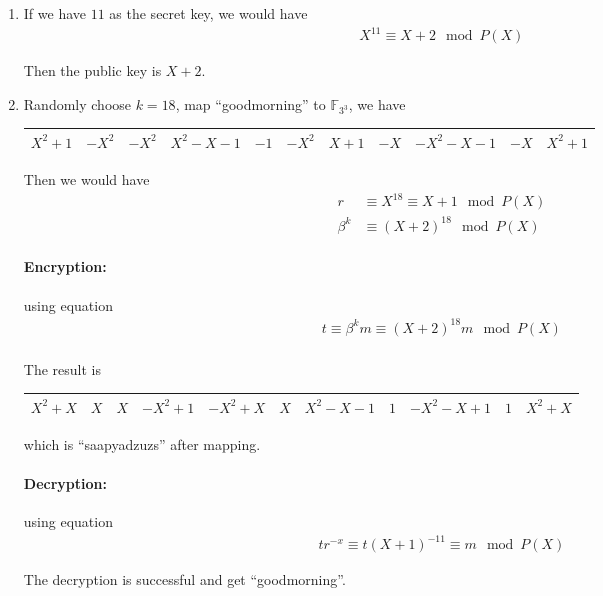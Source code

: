 \documentclass[11pt,a4paper]{article}
\begin{document}
\begin{enumerate}
\item If we have $11$ as the secret key, we would have
\begin{align*}
	X^{11} \equiv X + 2 \mod P(X)
\end{align*}
\par Then the public key is $X + 2$.

\newpage
\item Randomly choose $k = 18$, map ``goodmorning'' to $\mathbb{F}_{3^{3}}$, we have
\begin{table}[!ht]
\centering
\footnotesize
\begin{tabular}{|c|c|c|c|c|c|c|c|c|c|c|}
\hline
$X^2 + 1$ & $-X^2$ & $-X^2$ & $X^2 - X - 1$ & $-1$ & $-X^2$ & $X + 1$ & $-X$ & $- X^2 - X - 1$ & $-X$ & $X^2 + 1$ \\
\hline
\end{tabular}
\end{table}
\par Then we would have
\begin{align*}
	r &\equiv X^{18} \equiv X + 1 \mod P(X) \\
	\beta^{k} &\equiv (X+2)^{18} \mod P(X)
\end{align*}
\paragraph*{Encryption:} using equation
\begin{align*}
	t \equiv \beta^{k}m \equiv (X+2)^{18}m \mod P(X) \\
\end{align*}
\par The result is
\begin{table}[!ht]
\centering
\footnotesize
\begin{tabular}{|c|c|c|c|c|c|c|c|c|c|c|}
\hline
$X^2 + X$ & $X$ & $X$ & $-X^2 + 1$ & $-X^{2} + X$ & $X$ & $X^{2} -X - 1$ & $1$ & $- X^2 - X + 1$ & $1$ & $X^2 + X$ \\
\hline
\end{tabular}
\end{table}

which is ``saapyadzuzs'' after mapping.
\paragraph*{Decryption:} using equation
\begin{align*}
	tr^{-x} \equiv t(X+1)^{-11} \equiv m \mod P(X)
\end{align*}
\par The decryption is successful and get ``goodmorning''.
\end{enumerate}
\end{document}
